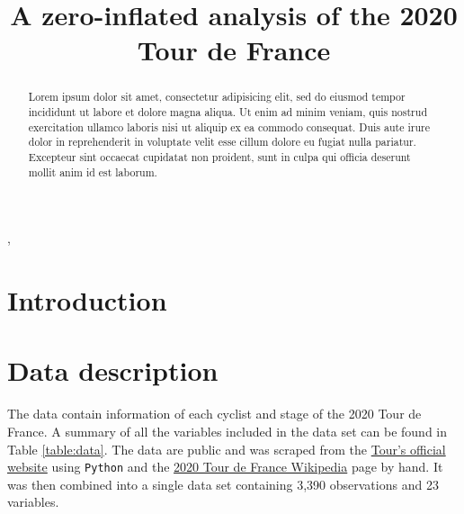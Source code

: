 \documentclass[aos,preprint]{imsart}
\begin{document}
\begin{frontmatter}
\title{A zero-inflated analysis of the 2020 Tour de France}

\begin{aug}
\author{ },

\runauthor{}


\address{Department of Statistics\\
University of British Columbia\\
Vancouver, BC, Canada V6T 1Z4\\
E-mail: \normalfont
\href{mailto:gian.diluvi@stat.ubc.ca}{gian.diluvi@stat.ubc.ca},}

\end{aug}

\begin{abstract}
Lorem ipsum dolor sit amet, consectetur adipisicing elit, sed do eiusmod tempor incididunt ut labore et dolore magna aliqua. Ut enim ad minim veniam, quis nostrud exercitation ullamco laboris nisi ut aliquip ex ea commodo consequat. Duis aute irure dolor in reprehenderit in voluptate velit esse cillum dolore eu fugiat nulla pariatur. Excepteur sint occaecat cupidatat non proident, sunt in culpa qui officia deserunt mollit anim id est laborum.
\end{abstract}


\end{frontmatter}

\section{Introduction} \label{sec:intro}


\section{Data description} \label{sec:data}


The data contain information of each cyclist and stage of the 2020 Tour de France. A summary of all the variables included in the data set can be found in Table \ref{table:data}. The data are public and was scraped from the \href{letour.fr}{Tour's official website} using \texttt{Python} and the \href{https://en.wikipedia.org/wiki/2020_Tour_de_France}{2020 Tour de France Wikipedia} page by hand. It was then combined into a single data set containing 3,390 observations and 23 variables. \\
\end{document}
